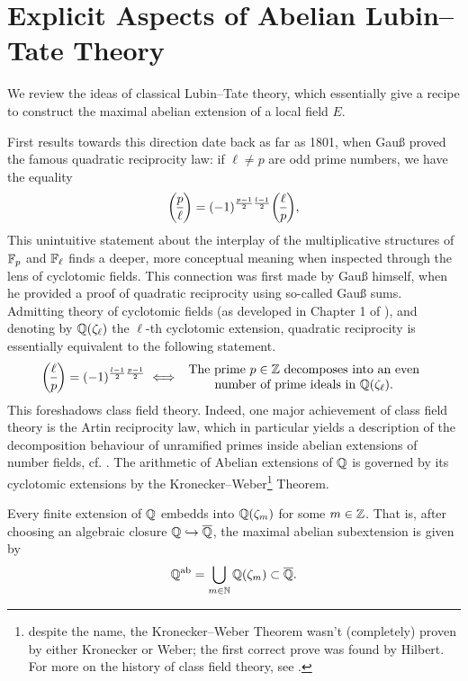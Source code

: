 \documentclass[../main.tex]{subfiles}
\begin{document}
\section{Explicit Aspects of Abelian Lubin--Tate Theory} %
\label{sec:Local Class Field Theory}
We review the ideas of classical Lubin--Tate theory, which essentially give 
a recipe to construct the maximal abelian extension of a local field $E$. 

First results towards this direction date back as far as 1801, when 
Gauß proved the famous quadratic reciprocity law: if $\ell \neq p$ are odd 
prime numbers, we have the equality
\begin{equation*}
  \legendre p \ell = (-1)^{\frac{p-1}2 \frac{l-1}2} \legendre \ell p,
\end{equation*}
This unintuitive statement about the interplay of the multiplicative structures of
$\mathbb{F}_p$ and $\mathbb{F}_\ell$ finds a deeper, more conceptual meaning when inspected through
the lens of cyclotomic fields. This connection
was first made by Gauß himself, when he provided a proof of quadratic
reciprocity using so-called Gauß sums. Admitting theory of cyclotomic fields 
(as developed in Chapter 1 of \cite{neukirch2006algebraische}), and denoting by
$\mathbb{Q}(\zeta_\ell)$ the $\ell$-th cyclotomic extension,
quadratic reciprocity is essentially equivalent to the following statement.
\begin{equation*}
  \legendre \ell p = (-1)^{\frac{l-1}2 \frac{p-1}2} \iff \begin{array}c
    \text{The prime $p \in \Z$
    decomposes into an even} \\ \text{number of prime ideals in
  $\Q(\zeta_\ell)$.} \end{array}
\end{equation*}
This foreshadows class field theory. Indeed, one major achievement
of class field theory is the Artin reciprocity law, which in particular yields a 
description of the decomposition behaviour of unramified primes inside abelian extensions
of number fields, cf. \cite[Theorem 7.3]{neukirch2006algebraische}. 
The arithmetic of Abelian extensions of $\mathbb{Q}$ is governed by its cyclotomic extensions
by the Kronecker--Weber\footnote{despite the name, the Kronecker--Weber Theorem
wasn't (completely) proven by either Kronecker or Weber; the first correct
prove was found by Hilbert. For more on the history of class field theory, see 
\cite{Conrad2009HISTORYOC}.} Theorem.
\begin{thm}\label{thm:KroneckerWeber}
  Every finite extension of $\mathbb{Q}$ embedds into $\mathbb{Q}(\zeta_m)$ for some $m \in \mathbb{Z}$.
  That is, after choosing an algebraic closure $\mathbb{Q} \hookrightarrow \overline {\mathbb{Q}}$, the maximal abelian
  subextension is given by 
  \begin{equation*}
    \mathbb{Q}^{\mathrm{ab}} = \bigcup_{m \in \mathbb{N}} \mathbb{Q}(\zeta_m) \subset \overline {\mathbb{Q}}.
  \end{equation*}
\end{thm}
\end{document}
